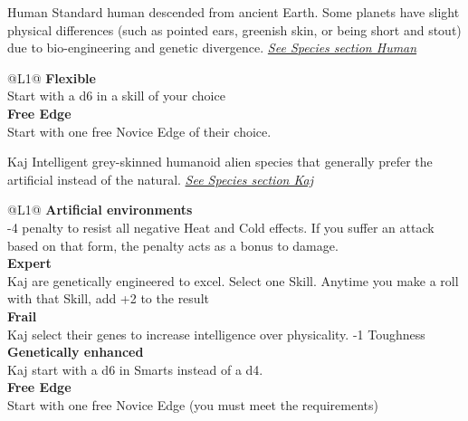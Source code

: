 \begin{genericsection}{Human}
  Standard human descended from ancient Earth. Some planets have slight physical differences (such as pointed ears, greenish skin, or being short and stout) due to bio-engineering and genetic divergence. \textit{\hyperref[sec:specie-human]{See Species section Human}}
\end{genericsection}
\begin{redtable}{\linewidth}{@{}L{1}@{}}
  \textbf{Flexible}\\
  Start with a d6 in a skill of your choice\\
  \textbf{Free Edge}\\
  Start with one free Novice Edge of their choice.\\
\end{redtable}
  
\begin{genericsection}{Kaj}
  Intelligent grey-skinned humanoid alien species that generally prefer the artificial instead of the natural. \textit{\hyperref[sec:specie-kaj]{See Species section Kaj}}
\end{genericsection}
\begin{redtable}{\linewidth}{@{}L{1}@{}}
  \textbf{Artificial environments}\\
  -4 penalty to resist all negative Heat and Cold effects. If you suffer an attack based on that form, the penalty acts as a bonus to damage.\\
  \textbf{Expert}\\
  Kaj are genetically engineered to excel. Select one Skill. Anytime you make a roll with that Skill, add +2 to the result\\
  \textbf{Frail}\\
  Kaj select their genes to increase intelligence over physicality. -1 Toughness\\
  \textbf{Genetically enhanced}\\
  Kaj start with a d6 in Smarts instead of a d4.\\
  \textbf{Free Edge}\\
  Start with one free Novice Edge (you must meet the requirements)\\
\end{redtable}
  
